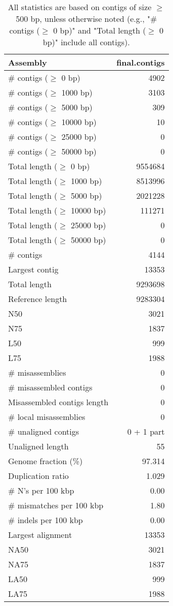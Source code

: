 \documentclass[12pt,a4paper]{article}
\begin{document}
\begin{table}[ht]
\begin{center}
\caption{All statistics are based on contigs of size $\geq$ 500 bp, unless otherwise noted (e.g., "\# contigs ($\geq$ 0 bp)" and "Total length ($\geq$ 0 bp)" include all contigs).}
\begin{tabular}{|l*{1}{|r}|}
\hline
Assembly & final.contigs \\ \hline
\# contigs ($\geq$ 0 bp) & 4902 \\ \hline
\# contigs ($\geq$ 1000 bp) & 3103 \\ \hline
\# contigs ($\geq$ 5000 bp) & 309 \\ \hline
\# contigs ($\geq$ 10000 bp) & 10 \\ \hline
\# contigs ($\geq$ 25000 bp) & 0 \\ \hline
\# contigs ($\geq$ 50000 bp) & 0 \\ \hline
Total length ($\geq$ 0 bp) & 9554684 \\ \hline
Total length ($\geq$ 1000 bp) & 8513996 \\ \hline
Total length ($\geq$ 5000 bp) & 2021228 \\ \hline
Total length ($\geq$ 10000 bp) & 111271 \\ \hline
Total length ($\geq$ 25000 bp) & 0 \\ \hline
Total length ($\geq$ 50000 bp) & 0 \\ \hline
\# contigs & 4144 \\ \hline
Largest contig & 13353 \\ \hline
Total length & 9293698 \\ \hline
Reference length & 9283304 \\ \hline
N50 & 3021 \\ \hline
N75 & 1837 \\ \hline
L50 & 999 \\ \hline
L75 & 1988 \\ \hline
\# misassemblies & 0 \\ \hline
\# misassembled contigs & 0 \\ \hline
Misassembled contigs length & 0 \\ \hline
\# local misassemblies & 0 \\ \hline
\# unaligned contigs & 0 + 1 part \\ \hline
Unaligned length & 55 \\ \hline
Genome fraction (\%) & 97.314 \\ \hline
Duplication ratio & 1.029 \\ \hline
\# N's per 100 kbp & 0.00 \\ \hline
\# mismatches per 100 kbp & 1.80 \\ \hline
\# indels per 100 kbp & 0.00 \\ \hline
Largest alignment & 13353 \\ \hline
NA50 & 3021 \\ \hline
NA75 & 1837 \\ \hline
LA50 & 999 \\ \hline
LA75 & 1988 \\ \hline
\end{tabular}
\end{center}
\end{table}
\end{document}
